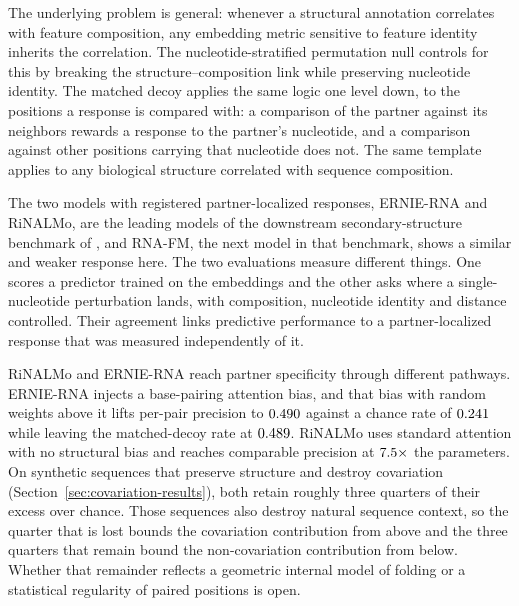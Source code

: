 \documentclass[11pt]{article}
\begin{document}
The underlying problem is general: whenever a structural annotation
correlates with feature composition, any embedding metric sensitive to
feature identity inherits the correlation. The nucleotide-stratified
permutation null controls for this by breaking the structure--composition
link while preserving nucleotide identity. The matched decoy applies the same
logic one level down, to the positions a response is compared with: a
comparison of the partner against its neighbors rewards a response to the
partner's nucleotide, and a comparison against other positions carrying that
nucleotide does not. The same template applies to any biological structure
correlated with sequence composition.

The two models with registered partner-localized responses, ERNIE-RNA and
RiNALMo, are the leading models of the downstream secondary-structure
benchmark of \citet{zablocki2025benchmarking}, and RNA-FM, the next model in
that benchmark, shows a similar and weaker response here. The two evaluations
measure different things. One scores a predictor trained on the embeddings and
the other asks where a single-nucleotide perturbation lands, with composition,
nucleotide identity and distance controlled. Their agreement links predictive
performance to a partner-localized response that was measured independently of
it.

RiNALMo and ERNIE-RNA reach partner specificity through different pathways.
ERNIE-RNA injects a base-pairing attention bias, and that bias with random
weights above it lifts per-pair precision to $0.490{}$
against a chance rate of $0.241{}$ while leaving the
matched-decoy rate at $0.489{}$. RiNALMo uses standard
attention with no structural bias and reaches comparable precision at
$7.5{}\times$ the parameters. On synthetic sequences that preserve
structure and destroy covariation (Section~\ref{sec:covariation-results}), both
retain roughly three quarters of their excess over chance. Those sequences also
destroy natural sequence context, so the quarter that is lost bounds the
covariation contribution from above and the three quarters that remain bound
the non-covariation contribution from below. Whether that remainder reflects a
geometric internal model of folding or a statistical regularity of paired
positions is open.
\end{document}
